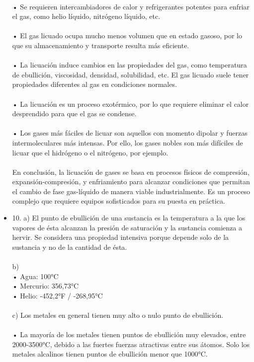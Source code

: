 \documentclass{article}
\begin{document}
\begin{itemize}
\\
• Se requieren intercambiadores de calor y refrigerantes potentes para enfriar el gas, como helio líquido, nitrógeno líquido, etc.\\
\\
• El gas licuado ocupa mucho menos volumen que en estado gasoso, por lo que su almacenamiento y transporte resulta más eficiente.\\
\\
• La licuación induce cambios en las propiedades del gas, como temperatura de ebullición, viscosidad, densidad, solubilidad, etc. El gas licuado suele tener propiedades diferentes al gas en condiciones normales.\\
\\
• La licuación es un proceso exotérmico, por lo que requiere eliminar el calor desprendido para que el gas se condense.\\
\\
• Los gases más fáciles de licuar son aquellos con momento dipolar y fuerzas intermoleculares más intensas. Por ello, los gases nobles son más difíciles de licuar que el hidrógeno o el nitrógeno, por ejemplo.\\
\\
En conclusión, la licuación de gases se basa en procesos físicos de compresión, expansión-compresión, y enfriamiento para alcanzar condiciones que permitan el cambio de fase gas-líquido de manera viable industrialmente. Es un proceso complejo que requiere equipos sofisticados para su puesta en práctica.\\
\item{10.}
a) El punto de ebullición de una sustancia es la temperatura a la que los vapores de ésta alcanzan la presión de saturación y la sustancia comienza a hervir. Se considera una propiedad intensiva porque depende solo de la sustancia y no de la cantidad de ésta.\\
\\
b)\\
• Agua: 100°C\\
• Mercurio: 356,73°C\\
• Helio: -452,2°F / -268,95°C\\
\\
c) Los metales en general tienen muy alto o nulo punto de ebullición.\\
\\
• La mayoría de los metales tienen puntos de ebullición muy elevados, entre 2000-3500°C, debido a las fuertes fuerzas atractivas entre sus átomos. Solo los metales alcalinos tienen puntos de ebullición menor que 1000°C.\\

\end{itemize}
\end{document}
